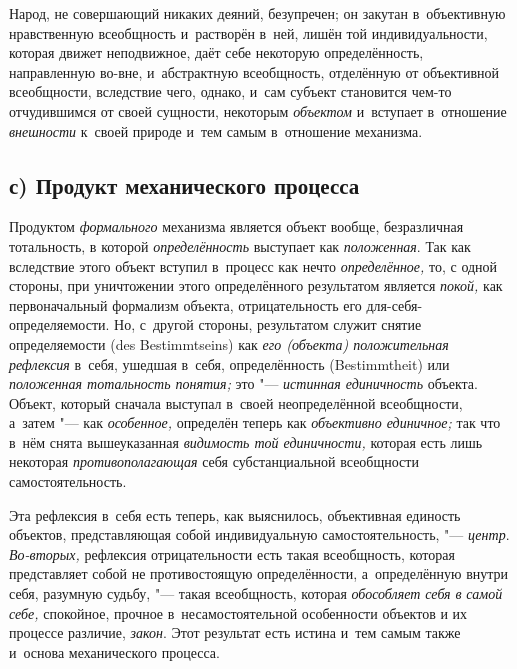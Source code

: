 Народ, не совершающий никаких деяний, безупречен; он закутан
в~объективную нравственную всеобщность и~растворён в~ней, лишён той
индивидуальности, которая движет неподвижное, даёт себе некоторую
определённость, направленную во-вне, и~абстрактную всеобщность, отделённую
от объективной всеобщности, вследствие чего, однако, и~сам субъект
становится чем-то отчудившимся от своей сущности, некоторым
{\em объектом} и~вступает
в~отношение {\em внешности}
к~своей природе и~тем самым в~отношение механизма.

\subsection[с) Продукт механического процесса]{с) Продукт механического процесса}

Продуктом
{\em формального}
механизма является объект вообще, безразличная тотальность, в
которой {\em определённость}
выступает как
{\em положенная}. Так как
вследствие этого объект вступил в~процесс как нечто
{\em определённое,} то, с
одной стороны, при уничтожении этого определённого результатом является
{\em покой,} как
первоначальный формализм объекта, отрицательность его
для-себя-определяемости. Но, с~другой стороны,
результатом служит
снятие
определяемости (des Bestimmt\-seins) как
{\em его (объекта) положительная
рефлексия} в~себя, ушедшая в~себя, определённость
(Bestimmt\-heit) или {\em положенная
тотальность понятия;} это
"--- {\em истинная единичность
}объекта. Объект, который сначала выступал в~своей
неопределённой всеобщности, а~затем "--- как
{\em особенное,}
определён теперь как
{\em объективно единичное;}
так что в~нём снята вышеуказанная
{\em видимость той единичности,}
которая есть лишь некоторая
{\em противополагающая}
себя субстанциальной всеобщности самостоятельность.

Эта рефлексия в~себя есть теперь, как выяснилось, объективная
единость объектов, представляющая собой индивидуальную самостоятельность,
"--- {\em центр}.
{\em Во-вторых,}
рефлексия отрицательности есть такая всеобщность, которая
представляет собой не противостоящую определённости, а~определённую внутри
себя, разумную судьбу, "--- такая всеобщность, которая
{\em обособляет себя в
}{\em самой себе,}
спокойное, прочное в~несамостоятельной особенности объектов и
их процессе различие, {\em закон}.
Этот результат есть истина и~тем самым также и~основа
механического процесса.

